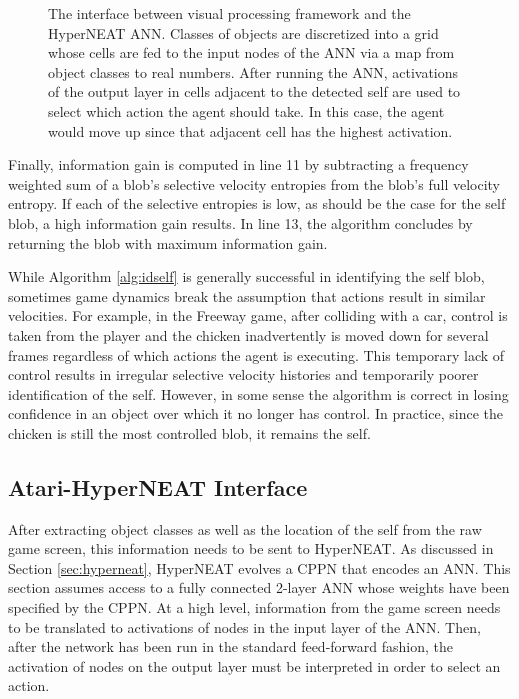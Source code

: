 \documentclass{acm_proc_article-sp}
\begin{document}
\begin{figure}
 \caption{The interface between visual processing framework and the HyperNEAT ANN. Classes of objects are discretized into a grid whose cells are fed to the input nodes of the ANN via a map from object classes to real numbers. After running the ANN, activations of the output layer in cells adjacent to the detected self are used to select which action the agent should take. In this case, the agent would move up since that adjacent cell has the highest activation.}
 \label{fig:interface}
\end{figure}

Finally, information gain is computed in line 11 by subtracting a frequency weighted sum of a blob's selective velocity entropies from the blob's full velocity entropy. If each of the selective entropies is low, as should be the case for the self blob, a high information gain results. In line 13, the algorithm concludes by returning the blob with maximum information gain.

While Algorithm \ref{alg:idself} is generally successful in identifying the self blob, sometimes game dynamics break the assumption that actions result in similar velocities. For example, in the Freeway game, after colliding with a car, control is taken from the player and the chicken inadvertently is moved down for several frames regardless of which actions the agent is executing. This temporary lack of control results in irregular selective velocity histories and temporarily poorer identification of the self. However, in some sense the algorithm is correct in losing confidence in an object over which it no longer has control. In practice, since the chicken is still the most controlled blob, it remains the self.

\subsection{Atari-HyperNEAT Interface}
\label{sec:interface}
After extracting object classes as well as the location of the self from the raw game screen, this information needs to be sent to HyperNEAT. As discussed in Section \ref{sec:hyperneat}, HyperNEAT evolves a CPPN that encodes an ANN. This section assumes access to a fully connected 2-layer ANN whose weights have been specified by the CPPN. At a high level, information from the game screen needs to be translated to activations of nodes in the input layer of the ANN. Then, after the network has been run in the standard feed-forward fashion, the activation of nodes on the output layer must be interpreted in order to select an action.
\end{document}
